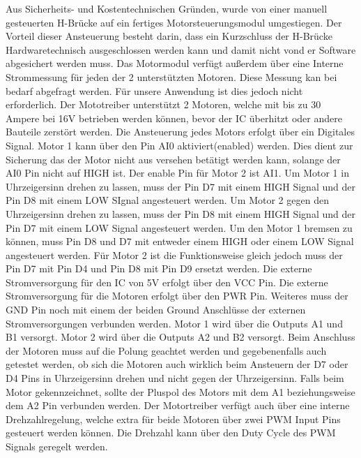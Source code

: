 Aus Sicherheits- und Kostentechnischen Gründen, wurde von einer manuell gesteuerten H-Brücke auf ein fertiges Motorsteuerungsmodul umgestiegen. Der Vorteil dieser Ansteuerung besteht darin, dass ein Kurzschluss der H-Brücke Hardwaretechnisch ausgeschlossen werden kann und damit nicht vond er Software abgesichert werden muss. Das Motormodul verfügt außerdem über eine Interne Strommessung für jeden der 2 unterstützten Motoren. Diese Messung kan bei bedarf abgefragt werden. Für unsere Anwendung ist dies jedoch nicht erforderlich. Der Mototreiber unterstützt 2 Motoren, welche mit bis zu 30 Ampere bei 16V betrieben werden können, bevor der IC überhitzt oder andere Bauteile zerstört werden. Die Ansteuerung jedes Motors erfolgt über ein Digitales Signal. Motor 1 kann über den Pin AI0 aktiviert(enabled) werden. Dies dient zur Sicherung das der Motor nicht aus versehen betätigt werden kann, solange der AI0 Pin nicht auf HIGH ist. Der enable Pin für Motor 2 ist AI1. Um Motor 1 in Uhrzeigersinn drehen zu lassen, muss der Pin D7 mit einem HIGH Signal und der Pin D8 mit einem LOW SIgnal angesteuert werden. Um Motor 2 gegen den Uhrzeigersinn drehen zu lassen, muss der Pin D8 mit einem HIGH Signal und der Pin D7 mit einem LOW Signal angesteuert werden. Um den Motor 1 bremsen zu können, muss Pin D8 und D7 mit entweder einem HIGH oder einem LOW Signal angesteuert werden. Für Motor 2 ist die Funktionsweise gleich jedoch muss der Pin D7 mit Pin D4 und Pin D8 mit Pin D9 ersetzt werden. Die externe Stromversorgung für den IC von 5V erfolgt über den VCC Pin. Die externe Stromversorgung für die Motoren erfolgt über den PWR Pin. Weiteres muss der GND Pin noch mit einem der beiden Ground Anschlüsse der externen Stromversorgungen verbunden werden. Motor 1 wird über die Outputs A1 und B1 versorgt. Motor 2 wird über die Outputs A2 und B2 versorgt. Beim Anschluss der Motoren muss auf die Polung geachtet werden und gegebenenfalls auch getestet werden, ob sich die Motoren auch wirklich beim Ansteuern der D7 oder D4 Pins in Uhrzeigersinn drehen und nicht gegen der Uhrzeigersinn. Falls beim Motor gekennzeichnet, sollte der Pluspol des Motors mit dem A1 beziehungsweise dem A2 Pin verbunden werden. Der Motortreiber verfügt auch über eine interne Drehzahlregelung, welche extra für beide Motoren über zwei PWM Input Pins gesteuert werden können. Die Drehzahl kann über den Duty Cycle des PWM Signals geregelt werden.
